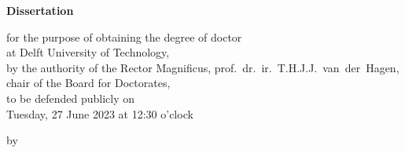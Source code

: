 \begin{titlepage}

\begin{center}

\vspace*{2\bigskipamount}

{\makeatletter
\titlestyle\bfseries\LARGE\@title
\makeatother}

{\makeatletter
\ifx\@subtitle\undefined\else
    \bigskip
    \titlefont\titleshape\Large\@subtitle
\fi
\makeatother}

\end{center}

\cleardoublepage
\thispagestyle{empty}

\begin{center}


\vspace*{2\bigskipamount}

{\makeatletter
\titlestyle\bfseries\LARGE\@title
\makeatother}

{\makeatletter
\ifx\@subtitle\undefined\else
    \bigskip
    \titlefont\titleshape\Large\@subtitle
\fi
\makeatother}

\vfill


{\Large\titlefont\bfseries Dissertation}

\bigskip
\bigskip

for the purpose of obtaining the degree of doctor \\
at Delft University of Technology, \\
by the authority of the Rector Magnificus, prof.~dr.~ir.~T.H.J.J.~van~der~Hagen, \\
chair of the Board for Doctorates, \\
to be defended publicly on \\
Tuesday, 27 June 2023 at 12:30 o'clock

\bigskip
\bigskip

by

\bigskip
\bigskip

\makeatletter
{\Large\titlefont\bfseries\@firstname\ \titleshape{\MakeUppercase{\@lastname}}}
\makeatother


\end{center}
\end{titlepage}

